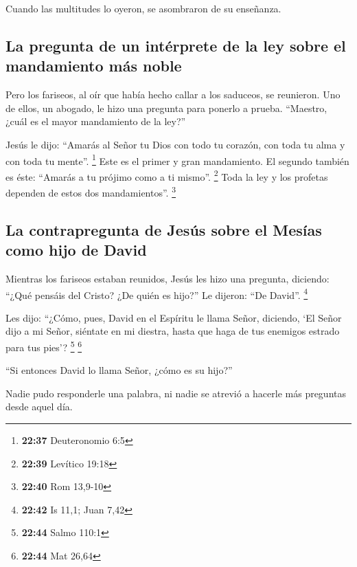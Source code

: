  Cuando las multitudes lo oyeron, se asombraron de su
enseñanza.

\hypertarget{la-pregunta-de-un-intuxe9rprete-de-la-ley-sobre-el-mandamiento-muxe1s-noble}{%
\subsection{La pregunta de un intérprete de la ley sobre el mandamiento
más
noble}\label{la-pregunta-de-un-intuxe9rprete-de-la-ley-sobre-el-mandamiento-muxe1s-noble}}

 Pero los fariseos, al oír que había hecho callar a los
saduceos, se reunieron.  Uno de ellos, un abogado, le
hizo una pregunta para ponerlo a prueba.  ``Maestro,
¿cuál es el mayor mandamiento de la ley?''

 Jesús le dijo: ``Amarás al Señor tu Dios con todo tu
corazón, con toda tu alma y con toda tu mente''. \footnote{\textbf{22:37}
  Deuteronomio 6:5}  Este es el primer y gran
mandamiento.  El segundo también es éste: ``Amarás a tu
prójimo como a ti mismo''. \footnote{\textbf{22:39} Levítico 19:18}
 Toda la ley y los profetas dependen de estos dos
mandamientos''. \footnote{\textbf{22:40} Rom 13,9-10}

\hypertarget{la-contrapregunta-de-jesuxfas-sobre-el-mesuxedas-como-hijo-de-david}{%
\subsection{La contrapregunta de Jesús sobre el Mesías como hijo de
David}\label{la-contrapregunta-de-jesuxfas-sobre-el-mesuxedas-como-hijo-de-david}}

 Mientras los fariseos estaban reunidos, Jesús les hizo
una pregunta,  diciendo: ``¿Qué pensáis del Cristo? ¿De
quién es hijo?'' Le dijeron: ``De David''. \footnote{\textbf{22:42} Is
  11,1; Juan 7,42}

 Les dijo: ``¿Cómo, pues, David en el Espíritu le llama
Señor, diciendo,  `El Señor dijo a mi Señor, siéntate en
mi diestra, hasta que haga de tus enemigos estrado para tus pies'?
\footnote{\textbf{22:44} Salmo 110:1} \footnote{\textbf{22:44} Mat 26,64}

 ``Si entonces David lo llama Señor, ¿cómo es su hijo?''

 Nadie pudo responderle una palabra, ni nadie se atrevió
a hacerle más preguntas desde aquel día.

